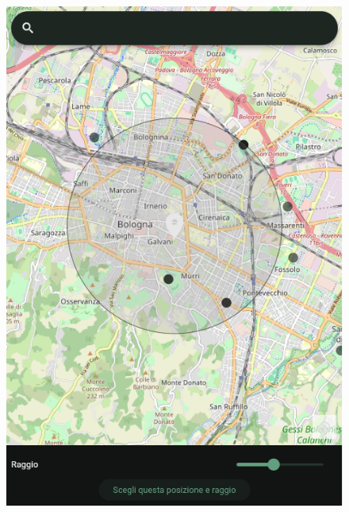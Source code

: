 \documentclass[a4paper,12pt]{article}
\begin{document}
\begin{figure}[h]
\begin{minipage}{0.32\textwidth}
        \includegraphics[width=1\linewidth]{img/select_radius.png}
    \end{minipage}
    \begin{minipage}{0.32\textwidth}
        \centering
        \label{fig:select_radius}

\end{minipage}
\end{figure}
\end{document}
